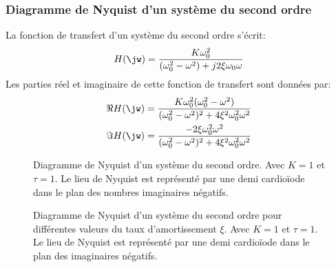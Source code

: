 \subsubsection{Diagramme de Nyquist d'un système du second ordre}
La fonction de transfert d'un système du second ordre s'écrit:
$$
H(\jw)=\dfrac{K\omega_0^2}{(\omega_0^2-\omega^2)+j2\xi\omega_0\omega}
$$
Les parties réel et imaginaire de cette fonction de transfert sont données par:
\begin{align*}
    \Re{H(\jw)}&=
    \dfrac{K\omega_0^2(\omega_0^2-\omega^2)}{(\omega_0^2-\omega^2)^2
    +4\xi^2\omega_0^2\omega^2}\\
    \Im{H(\jw)}&=\dfrac{-2\xi\omega_0^2\omega^2}{(\omega_0^2-\omega^2)^2
    +4\xi^2\omega_0^2\omega^2}\\
\end{align*}
\begin{figure}[!h]
    \centering
    
    \caption{Diagramme de Nyquist d'un système du second ordre. 
             Avec $K=1$ et $\tau=1$. Le lieu de Nyquist est représenté par 
             une demi cardio\"iode dans le plan des nombres imaginaires 
             négatifs.\label{fig-nyquist_2nd_1}}
\end{figure}
\begin{figure}[!h]
    \centering
    
    \caption{Diagramme de Nyquist d'un système du second ordre pour différentes 
             valeurs du taux d'amortissement $\xi$. Avec $K=1$ et $\tau=1$. Le 
             lieu de Nyquist est représenté par une demi cardio\"iode dans le 
             plan des imaginaires négatifs.\label{fig-nyquist_2nd_2}}
\end{figure}
\newpage
